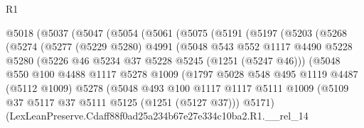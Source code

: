 \begin{lexlean}{R1}
\begin{coremodule}
                @5018
                  (@5037
                    (@5047
                      (@5054
                        (@5061
                          (@5075
                            (@5191
                              (@5197
                                (@5203
                                  (@5268
                                    (@5274
                                      (@5277
                                        (@5229 @5280)
                                        @4991
                                        (@5048
                                          @543
                                          @552
                                          @1117
                                          @4490
                                          @5228
                                          @5280
                                          (@5226 @46 @5234 @37 @5228 @5245 (@1251 (@5247 @46)))
                                          (@5048
                                            @550
                                            @100
                                            @4488
                                            @1117
                                            @5278
                                            @1009
                                            (@1797
                                              @5028
                                              @548
                                              @495
                                              @1119
                                              @4487
                                              (@5112 @1009)
                                              @5278
                                              (@5048
                                                @493
                                                @100
                                                @1117
                                                @1117
                                                @5111
                                                @1009
                                                (@5109
                                                  @37
                                                  @5117
                                                  @37
                                                  @5111
                                                  @5125
                                                  (@1251 (@5127 @37)))
                                                @5171)
                                              (LexLeanPreserve.Cdaff88f0ad25a234b67e27e334c10ba2.R1.__rel_14

\end{coremodule}
\end{lexlean}
